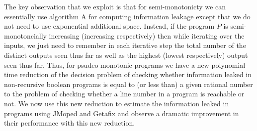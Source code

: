 The key observation that we exploit is that for semi-monotonicty we can essentially use algorithm A for computing information leakage except that we do not need to use exponential additional space. Instead, if the program $P$ is semi-monotoncially increasing (increasing respectively) then while iterating over the inputs,  we just need to remember in each iterative step  the total number of the distinct outputs seen thus far as well as the highest  (lowest respectively) output seen thus far. Thus, for psudeo-monotonic programs we have a new polynomial-time reduction of the decision problem of checking whether information leaked  in non-recursive boolean programs is  equal to (or less than) a given rational number to the problem of checking whether a line number in a program is reachable or not.  We now use this new reduction to estimate the information leaked in programs using JMoped and Getafix and  observe a dramatic improvement in their performance with this new reduction.



  
  













